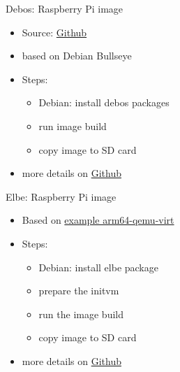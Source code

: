 \documentclass{beamer}
\begin{document}
\begin{frame}{Debos: Raspberry Pi image}
	\begin{itemize}
		\item Source: \href{https://github.com/go-debos/debos-recipes/tree/main/rpi64}{Github}
		\item based on Debian Bullseye
		\item Steps:
		\begin{itemize}
			\item Debian: install debos packages
			\item run image build
			\item copy image to SD card
		\end{itemize}
		\item more details on \href{https://github.com/tomirgang/eh21_maintainable_linux/tree/main/examples/first_build_rpi4/debos}{Github}
	\end{itemize}
\end{frame}


\begin{frame}{Elbe: Raspberry Pi image}
	\begin{itemize}
		\item Based on \href{https://github.com/Linutronix/elbe/blob/master/examples/arm64-qemu-virt.xml}{example arm64-qemu-virt}
		\item Steps:
		\begin{itemize}
			\item Debian: install elbe package
			\item prepare the initvm
			\item run the image build
			\item copy image to SD card
		\end{itemize}
		\item more details on \href{https://github.com/tomirgang/eh21_maintainable_linux/tree/main/examples/first_build_rpi4/elbe}{Github}
	\end{itemize}
\end{frame}
\end{document}
